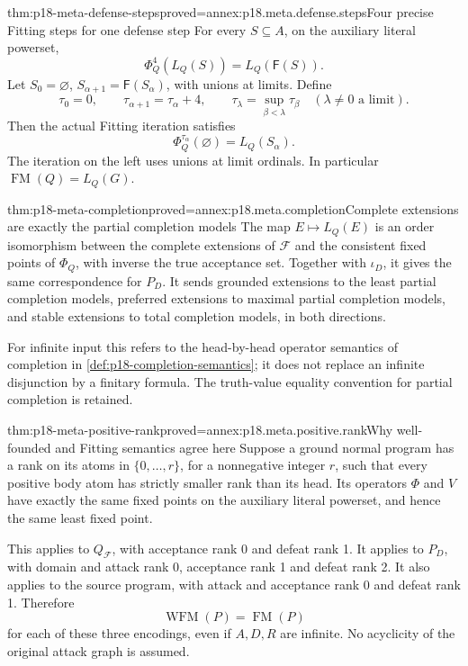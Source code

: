 \begin{hblemma}{thm:p18-meta-defense-steps}{proved=annex:p18.meta.defense.steps}{Four precise Fitting steps for one defense step}
For every \(S\subseteq A\), on the auxiliary literal powerset,
\[
                             \Phi_Q^4(L_Q(S))=L_Q(\mathsf F(S)).
\]
Let \(S_0=\varnothing\), \(S_{\alpha+1}=\mathsf F(S_\alpha)\),
with unions at limits. Define
\[
 \tau_0=0,\qquad \tau_{\alpha+1}=\tau_\alpha+4,\qquad
 \tau_\lambda=\sup_{\beta<\lambda}\tau_\beta
                   \quad(\lambda\ne0\text{ a limit}).
\]
Then the actual Fitting iteration satisfies
\[
                        \Phi_Q^{\tau_\alpha}(\varnothing)=L_Q(S_\alpha).
\]
The iteration on the left uses unions at limit ordinals.
In particular \(\operatorname{FM}(Q)=L_Q(G)\).
\end{hblemma}

\begin{hbtheorem}{thm:p18-meta-completion}{proved=annex:p18.meta.completion}{Complete extensions are exactly the partial completion models}
The map \(E\mapsto L_Q(E)\) is an order isomorphism between
the complete extensions of \(\mathcal F\) and the consistent
fixed points of \(\Phi_Q\), with inverse the true acceptance set.
Together with \(\iota_D\), it gives the same correspondence
for \(P_D\). It sends grounded extensions to the least partial
completion models, preferred extensions to maximal partial
completion models, and stable extensions to total completion
models, in both directions.

For infinite input this refers to the head-by-head operator
semantics of completion in \cref{def:p18-completion-semantics};
it does not replace an infinite disjunction by a finitary formula.
The truth-value equality convention for partial completion is
retained.
\end{hbtheorem}

\begin{hblemma}{thm:p18-meta-positive-rank}{proved=annex:p18.meta.positive.rank}{Why well-founded and Fitting semantics agree here}
Suppose a ground normal program has a rank on its atoms in
\(\{0,\ldots,r\}\), for a nonnegative integer \(r\), such that every positive body atom has
strictly smaller rank than its head. Its operators \(\Phi\)
and \(V\) have exactly the same fixed points on the auxiliary
literal powerset, and hence the same least fixed point.

This applies to \(Q_{\mathcal F}\), with acceptance rank 0
and defeat rank 1. It applies to \(P_D\), with domain and
attack rank 0, acceptance rank 1 and defeat rank 2.
It also applies to the source program, with attack and
acceptance rank 0 and defeat rank 1. Therefore
\[
                           \operatorname{WFM}(P)=\operatorname{FM}(P)
\]
for each of these three encodings, even if \(A,D,R\) are infinite.
No acyclicity of the original attack graph is assumed.
\end{hblemma}

